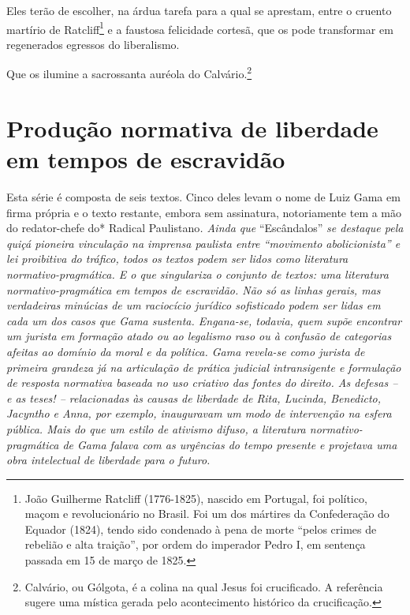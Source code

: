 Eles terão de escolher, na árdua tarefa para a qual se aprestam, entre o
cruento martírio de Ratcliff\footnote{João Guilherme Ratcliff
  (1776-1825), nascido em Portugal, foi político, maçom e revolucionário
  no Brasil. Foi um dos mártires da Confederação do Equador (1824),
  tendo sido condenado à pena de morte ``pelos crimes de rebelião e alta
  traição'', por ordem do imperador Pedro I, em sentença passada em 15 de
  março de 1825.} e a faustosa felicidade cortesã, que os pode
transformar em regenerados egressos do liberalismo.

Que os ilumine a sacrossanta auréola do Calvário.\footnote{Calvário,
  ou Gólgota, é a colina na qual Jesus foi crucificado. A referência
  sugere uma mística gerada pelo acontecimento histórico da
  crucificação.}

\part{Produção normativa de liberdade em tempos de escravidão}

\begin{didascalia}
Esta série é composta de seis textos. Cinco deles levam o nome de Luiz
Gama em firma própria e o texto restante, embora sem assinatura,
notoriamente tem a mão do redator-chefe do* Radical Paulistano\emph{.
Ainda que} ``Escândalos'' \emph{se destaque pela quiçá pioneira vinculação
na imprensa paulista entre ``movimento abolicionista'' e lei proibitiva do
tráfico, todos os textos podem ser lidos como literatura
normativo-pragmática. E o que singulariza o conjunto de textos: uma
literatura normativo-pragmática em tempos de escravidão. Não só as
linhas gerais, mas verdadeiras minúcias de um raciocício jurídico
sofisticado podem ser lidas em cada um dos casos que Gama sustenta.
Engana-se, todavia, quem supõe encontrar um jurista em formação atado ou
ao legalismo raso ou à confusão de categorias afeitas ao domínio da
moral e da política. Gama revela-se como jurista de primeira grandeza já
na articulação de prática judicial intransigente e formulação de
resposta normativa baseada no uso criativo das fontes do direito. As
defesas -- e as teses! -- relacionadas às causas de liberdade de Rita,
Lucinda, Benedicto, Jacyntho e Anna, por exemplo, inauguravam um modo de
intervenção na esfera pública. Mais do que um estilo de ativismo difuso,
a literatura normativo-pragmática de Gama falava com as urgências do
tempo presente e projetava uma obra intelectual de liberdade para o
futuro.}
\end{didascalia}

